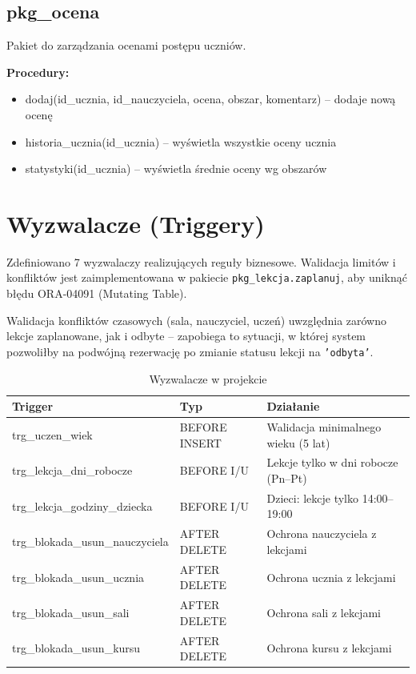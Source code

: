 \documentclass[12pt,a4paper]{article}
\begin{document}
\subsection{pkg\_ocena}

Pakiet do zarządzania ocenami postępu uczniów.

\textbf{Procedury:}
\begin{itemize}[nosep]
    \item dodaj(id\_ucznia, id\_nauczyciela, ocena, obszar, komentarz) -- dodaje nową ocenę
    \item historia\_ucznia(id\_ucznia) -- wyświetla wszystkie oceny ucznia
    \item statystyki(id\_ucznia) -- wyświetla średnie oceny wg obszarów
\end{itemize}

\newpage
\section{Wyzwalacze (Triggery)}

Zdefiniowano 7 wyzwalaczy realizujących reguły biznesowe. Walidacja limitów i konfliktów jest zaimplementowana w pakiecie \texttt{pkg\_lekcja.zaplanuj}, aby uniknąć błędu ORA-04091 (Mutating Table).

Walidacja konfliktów czasowych (sala, nauczyciel, uczeń) uwzględnia zarówno lekcje zaplanowane, jak i odbyte -- zapobiega to sytuacji, w której system pozwoliłby na podwójną rezerwację po zmianie statusu lekcji na \texttt{'odbyta'}.

\begin{table}[h]
\centering
\small
\begin{tabular}{|l|l|p{5.5cm}|}
\hline
\textbf{Trigger} & \textbf{Typ} & \textbf{Działanie} \\
\hline
trg\_uczen\_wiek & BEFORE INSERT & Walidacja minimalnego wieku (5 lat) \\
\hline
trg\_lekcja\_dni\_robocze & BEFORE I/U & Lekcje tylko w dni robocze (Pn--Pt) \\
\hline
trg\_lekcja\_godziny\_dziecka & BEFORE I/U & Dzieci: lekcje tylko 14:00--19:00 \\
\hline
trg\_blokada\_usun\_nauczyciela & AFTER DELETE & Ochrona nauczyciela z lekcjami \\
\hline
trg\_blokada\_usun\_ucznia & AFTER DELETE & Ochrona ucznia z lekcjami \\
\hline
trg\_blokada\_usun\_sali & AFTER DELETE & Ochrona sali z lekcjami \\
\hline
trg\_blokada\_usun\_kursu & AFTER DELETE & Ochrona kursu z lekcjami \\
\hline
\end{tabular}
\caption{Wyzwalacze w projekcie}
\end{table}
\end{document}
